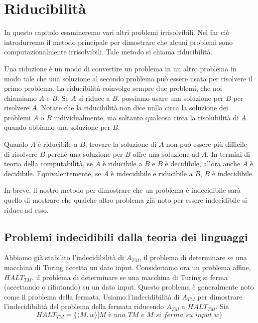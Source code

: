 \chapter{Riducibilità}
In questo capitolo esamineremo vari altri problemi irrisolvibili. Nel far ciò introdurremo il metodo principale per dimostrare che alcuni problemi sono computazionalmente irrisolvibili. Tale metodo si chiama riducibilità.

Una riduzione è un modo di convertire un problema in un altro problema in modo tale che una soluzione al secondo problema può essere usata per risolvere il primo problema. La riducibilità coinvolge sempre due problemi, che noi chiamiamo $A$ e $B$. Se $A$ si riduce a $B$, possiamo usare una soluzione per $B$ per risolvere $A$. Notate che la riducibilità non dice nulla circa la soluzione dei problemi $A$ o $B$ individualmente, ma soltanto qualcosa circa la risolubilità di $A$ quando abbiamo una soluzione per $B$.

Quando $A$ è riducibile a $B$, trovare la soluzione di $A$ non può essere più difficile di risolvere $B$ perché una soluzione per $B$ offre una soluzione ad $A$. In termini di teoria della computabilità, se $A$ è riducibile a $B$ e $B$ è decidibile, allora anche $A$ è decidibile. Equivalentemente, se $A$ è indecidibile e riducibile a $B$, $B$ è indecidibile.

In breve, il nostro metodo per dimostrare che un problema è indecidibile sarà quello di mostrare che qualche altro problema già noto per essere indecidibile si riduce ad esso.

\section{Problemi indecidibili dalla teoria dei linguaggi}
Abbiamo già stabilito l'indecidibilità di $A_{TM}$, il problema di determinare se una macchina di Turing accetta un dato input. Consideriamo ora un problema affine, $HALT_{TM}$, il problema di determinare se una macchina di Turing si ferma (accettando o rifiutando) su un dato input. Questo problema è generalmente noto come il problema della fermata. Usiamo l'indecidibilità di $A_{TM}$ per dimostrare l'indecidibilità del problema della fermata riducendo $A_{TM}$ a $HALT_{TM}$. Sia
\begin{equation*}
HALT_{TM} = \{\langle M,w\rangle | M\textit{ è una TM e M si ferma su input }w\}
\end{equation*}

